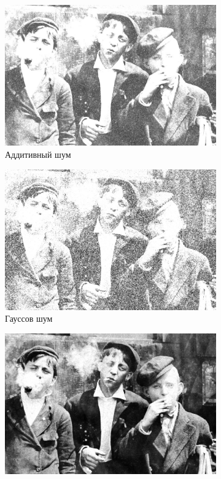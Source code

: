 \begin{figure}[ht!]
\begin{subfigure}[b]{0.5\linewidth}
      \includegraphics[width=0.95\linewidth]{../Rang_Filter/Rang_Additive_noise_(k=3,r=9).jpg} 
      \caption{Аддитивный шум} 
      \label{rang_3_9:c} 
      \vspace{4ex}
    \end{subfigure}%
    \begin{subfigure}[b]{0.5\linewidth}
      \centering
      \includegraphics[width=0.95\linewidth]{../Rang_Filter/Rang_Gaussian_noise_(k=3,r=9).jpg} 
      \caption{Гауссов шум} 
      \label{rang_3_9:d} 
      \vspace{4ex}
    \end{subfigure}
    \begin{subfigure}[b]{0.5\linewidth}
      \centering
      \includegraphics[width=0.95\linewidth]{../Rang_Filter/Rang_Poisson_noise_(k=3,r=9).jpg} 

\end{subfigure}
\end{figure}
